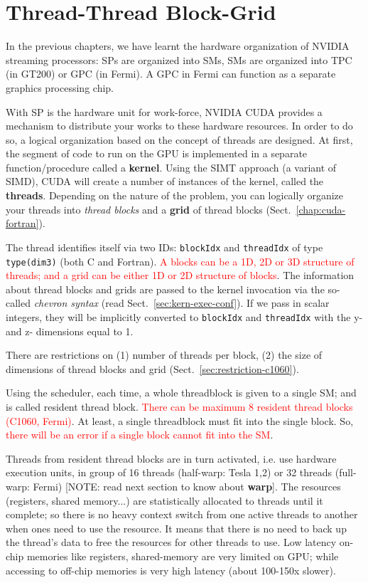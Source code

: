 \section{Thread-Thread Block-Grid}

In the previous chapters, we have learnt the hardware organization of
NVIDIA streaming processors: SPs are organized into SMs, SMs are
organized into TPC (in GT200) or GPC (in Fermi). A GPC in Fermi can
function as a separate graphics processing chip. 

With SP is the hardware unit for work-force, NVIDIA CUDA provides a mechanism to
distribute your works to these hardware resources. In order to do so, a logical
organization based on the concept of threads are designed. At first, the segment
of code to run on the GPU is implemented in a separate function/procedure called
a {\bf kernel}. Using the SIMT approach (a variant of SIMD), CUDA will create a
number of instances of the kernel, called the {\bf threads}. Depending on the
nature of the problem, you can logically organize your threads into {\it thread
blocks} and a {\bf grid} of thread blocks (Sect.~\ref{chap:cuda-fortran}).

The thread identifies itself via two IDs: \verb!blockIdx! and
\verb!threadIdx!  of type \verb!type(dim3)! (both C and Fortran).
\textcolor{red}{A blocks can be a 1D, 2D or 3D structure of threads;
  and a grid can be either 1D or 2D structure of blocks}.
The information about thread blocks and grids are passed to the kernel
invocation via the so-called {\it chevron syntax} (read
Sect.~\ref{sec:kern-exec-conf}). If we pass in scalar integers, they
will be implicitly converted to \verb!blockIdx!  and \verb!threadIdx!
with the y- and z- dimensions equal to 1.

\begin{framed}
  There are restrictions on (1) number of threads per block, (2) the
  size of dimensions of thread blocks and grid
  (Sect.~\ref{sec:restriction-c1060}). 
\end{framed}

Using the scheduler, each time, a whole threadblock is given to a single SM; and
is called resident thread block.   \textcolor{red}{There can be maximum 8
resident thread blocks (C1060, Fermi)}. At least, a single threadblock must fit
into the single block. So, \textcolor{red}{there will be an error if a single
block cannot fit into the SM}.

Threads from resident thread blocks are in turn activated, i.e. use hardware
execution units, in group of 16 threads (half-warp: Tesla 1,2) or 32 threads
(full-warp: Fermi) [NOTE: read next section to know about {\bf warp}]. The
resources (registers, shared memory...) are statistically allocated to threads
until it complete; so there is no heavy context switch from one active threads
to another when ones need to use the resource. It means that there is no need to
back up the thread's data to free the resources for other threads to use. Low
latency on-chip memories like registers, shared-memory are very limited on GPU;
while accessing to off-chip memories is very high latency (about 100-150x
slower).

